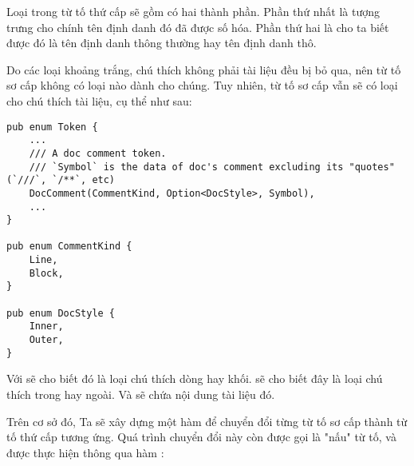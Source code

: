     Loại  trong từ tố thứ cấp sẽ gồm có hai thành phần. Phần thứ nhất là  tượng trưng cho chính tên định danh đó đã được số hóa. Phần thứ hai là  cho ta biết được đó là tên định danh thông thường hay tên định danh thô.

    Do các loại khoảng trắng, chú thích không phải tài liệu đều bị bỏ qua, nên từ tố sơ cấp không có loại nào dành cho chúng. Tuy nhiên, từ tố sơ cấp vẫn sẽ có loại cho chú thích tài liệu, cụ thể như sau:

\begin{lstlisting}[]
pub enum Token {
    ...
    /// A doc comment token.
    /// `Symbol` is the data of doc's comment excluding its "quotes" (`///`, `/**`, etc)
    DocComment(CommentKind, Option<DocStyle>, Symbol),
    ...
}

pub enum CommentKind {
    Line,
    Block,
}

pub enum DocStyle {
    Inner,
    Outer,
}
\end{lstlisting}

    Với  sẽ cho biết đó là loại chú thích dòng hay khối.  sẽ cho biết đây là loại chú thích trong hay ngoài. Và  sẽ chứa nội dung tài liệu đó.

    Trên cơ sở đó, Ta sẽ xây dựng một hàm để chuyển đổi từng từ tố sơ cấp thành từ tố thứ cấp tương ứng. Quá trình chuyển đổi này còn được gọi là "nấu" từ tố, và được thực hiện thông qua hàm :

